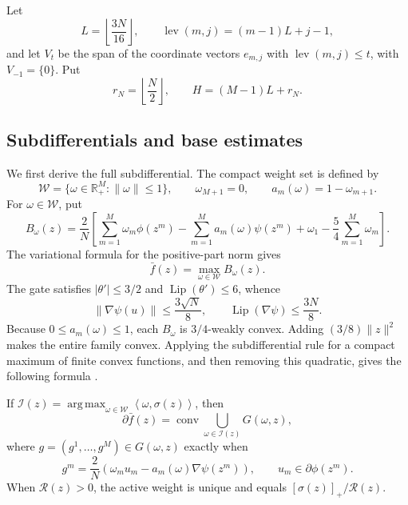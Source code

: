 \documentclass[11pt,a4paper]{article}
\newcommand{\R}{\mathbb{R}}
\newcommand{\norm}[1]{\left\lVert #1\right\rVert}
\newcommand{\inner}[2]{\left\langle #1,#2\right\rangle}
\newcommand{\cW}{\mathcal W}
\newcommand{\cI}{\mathcal I}
\DeclareMathOperator{\conv}{conv}
\DeclareMathOperator{\lev}{lev}
\DeclareMathOperator*{\argmax}{arg\,max}
\theoremstyle{definition}
\numberwithin{equation}{section}
\newcommand{\Lip}{\operatorname{Lip}}
\begin{document}
Let
\[
 L=\left\lfloor\frac{3N}{16}\right\rfloor,
 \qquad
 \lev(m,j)=(m-1)L+j-1,
\]
and let $V_t$ be the span of the coordinate vectors $e_{m,j}$ with $\lev(m,j)\le t$, with $V_{-1}=\{0\}$.  Put
\[
 r_N=\left\lfloor\frac N2\right\rfloor,
 \qquad
 H=(M-1)L+r_N.
\]





\subsection{Subdifferentials and base estimates}

We first derive the full subdifferential. The compact weight set is defined by
\[
 \cW=\{\omega\in\R_+^M:\norm\omega\le1\},
 \qquad
 \omega_{M+1}=0,
 \qquad
 a_m(\omega)=1-\omega_{m+1}.
\]
For $\omega\in\cW$, put
\[
 B_\omega(z)=\frac2N\left[
 \sum_{m=1}^M\omega_m\phi(z^m)
 -\sum_{m=1}^M a_m(\omega)\psi(z^m)
 +\omega_1-\frac54\sum_{m=1}^M\omega_m\right].
\]
The variational formula for the positive-part norm gives
\begin{equation}\label{eq:base-max}
 \bar f(z)=\max_{\omega\in\cW}B_\omega(z).
\end{equation}
The gate satisfies $|\theta'|\le3/2$ and $\Lip(\theta')\le6$, whence
\begin{equation}\label{eq:psi-derivatives}
 \|\nabla\psi(u)\|\le\frac{3\sqrt N}{8},
 \qquad \Lip(\nabla\psi)\le\frac{3N}{8}.
\end{equation}
Because $0\le a_m(\omega)\le1$, each $B_\omega$ is $3/4$-weakly convex.
Adding $(3/8)\|z\|^2$ makes the entire family convex. Applying the
subdifferential rule for a compact maximum of finite convex functions,
and then removing this quadratic, gives the following formula
\cite[Chapter~10]{RockafellarWets}.

If $\cI(z)=\argmax_{\omega\in\cW}\inner{\omega}{\sigma(z)}$, then
\begin{equation}\label{eq:subdiffformula}
 \partial\bar f(z)
 =\conv\bigcup_{\omega\in\cI(z)}G(\omega,z),
\end{equation}
where $g=(g^1,\ldots,g^M)\in G(\omega,z)$ exactly when
\begin{equation}\label{eq:blockg}
 g^m=\frac2N\left(\omega_m u_m-a_m(\omega)\nabla\psi(z^m)\right),
 \qquad
 u_m\in\partial\phi(z^m).
\end{equation}
When $\mathcal R(z)>0$, the active weight is unique and equals $[\sigma(z)]_+/\mathcal R(z)$.
\end{document}
